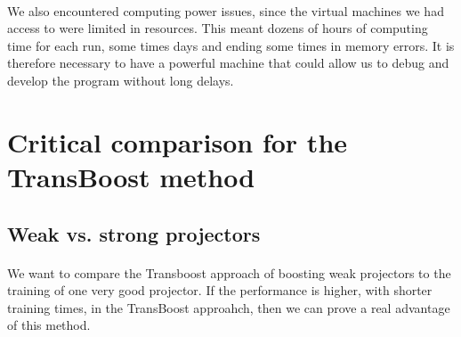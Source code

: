 \documentclass[11 pt]{article}
\begin{document}
\paragraph{} We also encountered computing power issues, since the virtual machines we had access to were limited in resources. This meant dozens of hours of computing time for each run, some times days and ending some times in memory errors. It is therefore necessary to have a powerful machine that could allow us to debug and develop the program without long delays. 

\section{Critical comparison for the TransBoost method}

\subsection{Weak vs. strong projectors}

\paragraph{}We want to compare the Transboost approach of boosting weak projectors to the training of one very good projector. If the performance is higher, with shorter training times, in the TransBoost approahch, then we can prove a real advantage of this method. 

\end{document}
